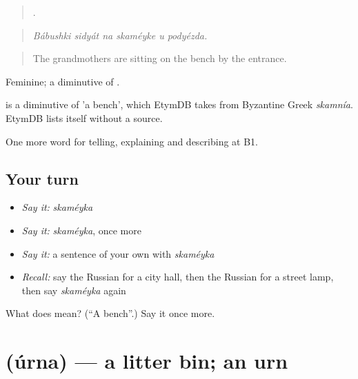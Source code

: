 \begin{quote}
     .
\end{quote}

\begin{quote}
\emph{Bábushki sidyát na skaméyke u podyézda.}
\end{quote}

\begin{quote}
The grandmothers are sitting on the bench by the entrance.
\end{quote}

Feminine; a diminutive of \emph{}.

\begin{cousinweb}
\emph{} is a diminutive of \emph{} 'a bench', which EtymDB takes from Byzantine Greek \emph{skamnía}. EtymDB lists \emph{} itself without a source.
\end{cousinweb}

\begin{grammarlens}[title={What you've built}]
One more word for telling, explaining and describing at B1.
\end{grammarlens}

\subsection*{Your turn}
\begin{itemize}
\raggedright
  \item \emph{Say it:} \emph{skaméyka}
  \item \emph{Say it:} \emph{skaméyka}, once more
  \item \emph{Say it:} a sentence of your own with \emph{skaméyka}
  \item \emph{Recall:} say the Russian for a city hall, then the Russian for a street lamp, then say \emph{skaméyka} again
\end{itemize}

\begin{tcolorbox}[breakable,colback=teal!4,colframe=teal!35!black,title={Before you move on}]
What does  mean? (\textquotedblleft{}A bench\textquotedblright{}.) Say it once more.
\end{tcolorbox}
\section[\texorpdfstring{\ru{урна} (úrna)}{урна (úrna)}]{ (úrna) — a litter bin; an urn}

